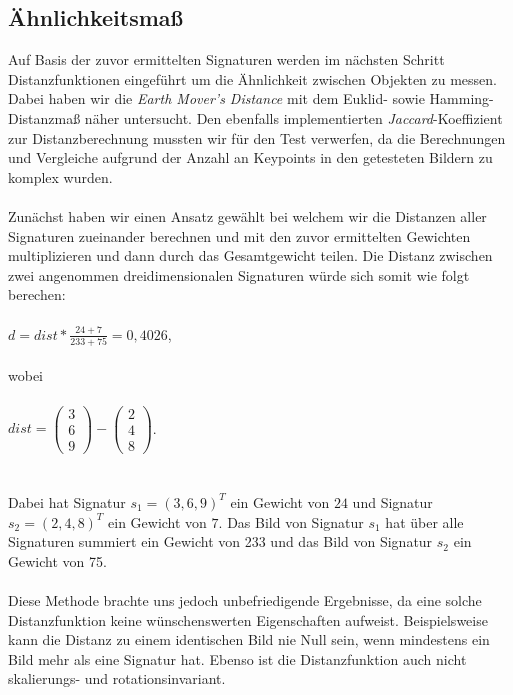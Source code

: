 \documentclass{scrartcl}
\begin{document}
\subsection{Ähnlichkeitsmaß}
Auf Basis der zuvor ermittelten Signaturen werden im nächsten Schritt Distanzfunktionen eingeführt um die Ähnlichkeit zwischen Objekten zu messen. Dabei haben wir die \textit{Earth Mover's Distance} mit dem Euklid- sowie Hamming-Distanzmaß näher untersucht. Den ebenfalls implementierten \textit{Jaccard}-Koeffizient zur Distanzberechnung mussten wir für den Test verwerfen, da die Berechnungen und Vergleiche aufgrund der Anzahl an Keypoints in den getesteten Bildern zu komplex wurden.
\\
\\
Zunächst haben wir einen Ansatz gewählt bei welchem wir die Distanzen aller Signaturen zueinander berechnen und mit den zuvor ermittelten Gewichten multiplizieren und dann durch das Gesamtgewicht teilen. Die Distanz zwischen zwei angenommen dreidimensionalen Signaturen würde sich somit wie folgt berechen: 
\\
\\
$d = dist * \frac {24 + 7} {233 + 75} = 0,4026$,
\\
\\
wobei 
\\
\\
$dist = \left( \begin{array}{c} 3 \\ 6 \\ 9 \end{array}\right) - \left( \begin{array}{c} 2 \\ 4 \\ 8 \end{array}\right)$.
\\ 
\\
\\
Dabei hat Signatur $s_{1} = (3,6,9)^{T}$ ein Gewicht von $24$ und Signatur $s_{2} = (2,4,8)^{T}$ ein Gewicht von $7$. Das Bild von Signatur $s_{1}$ hat über alle Signaturen summiert ein Gewicht von 233 und das Bild von Signatur $s_{2}$ ein Gewicht von 75.
\\
\\
Diese Methode brachte uns jedoch unbefriedigende Ergebnisse, da eine solche Distanzfunktion keine wünschenswerten  Eigenschaften aufweist. Beispielsweise kann die Distanz zu einem identischen Bild nie Null sein, wenn mindestens ein Bild mehr als eine Signatur hat. Ebenso ist die Distanzfunktion auch nicht skalierungs- und rotationsinvariant. 
\end{document}
